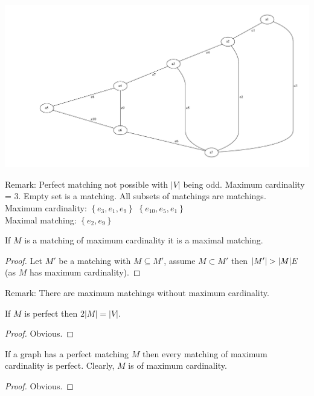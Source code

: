 \begin{example*}
\includegraphics[scale=0.35]{diagrams/Chapter4_Example1.pdf}\\
\end{example*}
Remark: Perfect matching not possible with $\lvert V \rvert$ being odd. 
Maximum cardinality = 3. Empty set is a matching. All subsets of matchings are matchings.
\\
Maximum cardinality:
$\left\{e_{3},e_{1},e_{9}\right\}$
 $\left\{e_{10},e_{5},e_{1}\right\}$\\
Maximal matching:
$\left\{e_{2},e_{9}\right\}$
\begin{lemma}
If $M$ is a matching of maximum cardinality it is a maximal matching.
\end{lemma}
\begin{proof}
Let $M'$ be a matching with $M\subseteq M'$, assume $M \subset M'$ then $\lvert
M' \rvert > \lvert M \rvert \Lightning \:$(as $M$ has maximum cardinality).
\end{proof}
Remark: There are maximum matchings without maximum cardinality.
\begin{lemma}
If $M$ is perfect then $2 \lvert M \rvert = \lvert V \rvert$.
\end{lemma}
\begin{proof}
Obvious.
\end{proof}
\begin{lemma}
If a graph has a perfect matching $M$ then every matching of maximum cardinality is perfect. Clearly, $M$ is
of maximum cardinality.
\end{lemma}
\begin{proof}
Obvious.
\end{proof}
